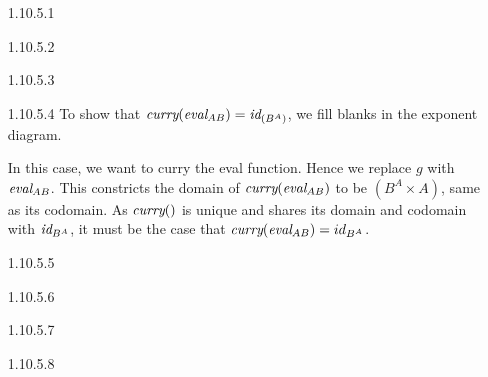 \documentclass{article}
\newcommand{\curry}[1]{\emph{curry}(#1)}
\newcommand{\eval}{\emph{eval}}
\newcommand{\id}{\emph{id}}
\begin{document}
\begin{enumerate}
\item [1.10.5.1]
\item [1.10.5.2]
\item [1.10.5.3]
\item [1.10.5.4]
  To show that $\curry{\eval_{AB}} = \id_{(B^A)}$, we fill blanks in the exponent diagram.
  \begin{center}
  \end{center}

  In this case, we want to curry the eval function.
  Hence we replace $g$ with $\eval_{AB}$.
  This constricts the domain of $\curry{\eval_{AB}}$ to be $(B^A \times A)$, same as its codomain.
  As $\curry{}$ is unique and shares its domain and codomain with $\id_{B^A}$, it must be the case that $\curry{\eval_{AB}} = id_{B^A}$.
  \begin{center}
  \end{center}

\item [1.10.5.5]
\item [1.10.5.6]
\item [1.10.5.7]
\item [1.10.5.8]
\end{enumerate}
\end{document}
